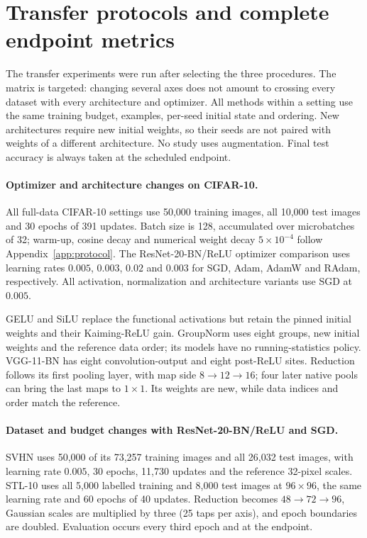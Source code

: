 \FloatBarrier
\section{Transfer protocols and complete endpoint metrics}
\label{app:transfer}
The transfer experiments were run after selecting the three procedures. The matrix is targeted: changing several axes does not amount to crossing every dataset with every architecture and optimizer. All methods within a setting use the same training budget, examples, per-seed initial state and ordering. New architectures require new initial weights, so their seeds are not paired with weights of a different architecture. No study uses augmentation. Final test accuracy is always taken at the scheduled endpoint.

\paragraph{Optimizer and architecture changes on CIFAR-10.}
All full-data CIFAR-10 settings use 50,000 training images, all 10,000 test images and 30 epochs of 391 updates. Batch size is 128, accumulated over microbatches of 32; warm-up, cosine decay and numerical weight decay $5\times10^{-4}$ follow Appendix~\ref{app:protocol}. The ResNet-20-BN/ReLU optimizer comparison uses learning rates $0.005$, $0.003$, $0.02$ and $0.003$ for SGD, Adam, AdamW and RAdam, respectively. All activation, normalization and architecture variants use SGD at $0.005$.

GELU and SiLU replace the functional activations but retain the pinned initial weights and their Kaiming-ReLU gain. GroupNorm uses eight groups, new initial weights and the reference data order; its models have no running-statistics policy. VGG-11-BN has eight convolution-output and eight post-ReLU sites. Reduction follows its first pooling layer, with map side $8\to12\to16$; four later native pools can bring the last maps to $1\times1$. Its weights are new, while data indices and order match the reference.

\paragraph{Dataset and budget changes with ResNet-20-BN/ReLU and SGD.}
SVHN uses 50,000 of its 73,257 training images and all 26,032 test images, with learning rate $0.005$, 30 epochs, 11,730 updates and the reference 32-pixel scales. STL-10 uses all 5,000 labelled training and 8,000 test images at $96\times96$, the same learning rate and 60 epochs of 40 updates. Reduction becomes $48\to72\to96$, Gaussian scales are multiplied by three (25 taps per axis), and epoch boundaries are doubled. Evaluation occurs every third epoch and at the endpoint.

